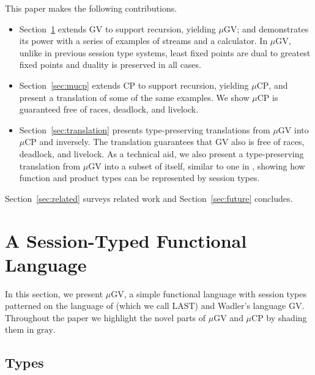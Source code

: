 \documentclass[orivec,envcountsame]{llncs}
\newcommand{\mucp}{$\mu\mathrm{CP}$\xspace}
\newcommand{\mugv}{$\mu\mathrm{GV}$\xspace}
\newcommand\shade[1]{\setlength{\fboxsep}{0pt}\colorbox{shade}{\ensuremath{#1}}}
\begin{document}
This paper makes the following contributions.
\begin{itemize}
\item Section~\ref{sec:mugv} extends GV to support recursion, yielding \mugv; and demonstrates its
  power with a series of examples of streams and a calculator.  In \mugv, unlike in previous session
  type systems, least fixed points are dual to greatest fixed points and duality is preserved in all
  cases.
\item Section~\ref{sec:mucp} extends CP to support recursion, yielding \mucp, and present a
  translation of some of the same examples. We show \mucp is guaranteed free of races, deadlock, and
  livelock.
\item Section~\ref{sec:translation} presents type-preserving translations from \mugv into \mucp and
  inversely. The translation guarantees that GV also is free of races, deadlock, and livelock.
  As a technical aid, we also present a type-preserving translation from \mugv into a
  subset of itself, similar to one in \citet{LindleyM14}, showing how function and product
  types can be represented by session types.
\end{itemize}
Section~\ref{sec:related} surveys related work and Section~\ref{sec:future} concludes.

\section{A Session-Typed Functional Language}
\label{sec:mugv}

In this section, we present \mugv, a simple functional language with session types patterned on the
language of \citet{GayVasconcelos10} (which we call LAST) and Wadler's language GV.
%
Throughout the paper we highlight the novel parts of \mugv and \mucp by shading them in
\shade{\mathrm{gray}}.

\subsection{Types}
\label{sec:mugv-types}
\end{document}
